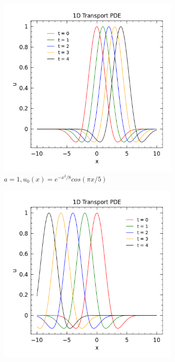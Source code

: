 \documentclass[10pt]{article}
\begin{document}
\begin{figure}[h]
        \centering
        \begin{subfigure}[b]{0.4\textwidth}
            \centering
            \includegraphics[width=\textwidth]{1DTransport_1.png}
            \caption[Network2]%
            {{\small $a = 1, u_0(x) = e^{-x^2/8}cos(\pi x/5)$}}    
            \label{fig:mean and std of net14}
        \end{subfigure}
        \quad\quad\quad
        \begin{subfigure}[b]{0.4\textwidth}  
            \centering 
            \includegraphics[width=\textwidth]{1DTransport_2.png}

\end{subfigure}
\end{figure}
\end{document}
